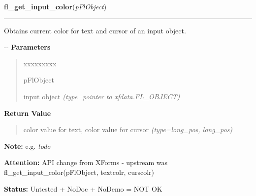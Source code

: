 \hspace{.8\funcindent}\begin{boxedminipage}{\funcwidth}

    \raggedright \textbf{fl\_get\_input\_color}(\textit{pFlObject})

    \vspace{-1.5ex}

    \rule{\textwidth}{0.5\fboxrule}
\setlength{\parskip}{2ex}

Obtains current color for text and cursor of an input object.

-{}-
\setlength{\parskip}{1ex}
      \textbf{Parameters}
      \vspace{-1ex}

      \begin{quote}
        \begin{Ventry}{xxxxxxxxx}

          \item[pFlObject]


input object
            {\it (type=pointer to xfdata.FL\_OBJECT)}

        \end{Ventry}

      \end{quote}

      \textbf{Return Value}
    \vspace{-1ex}

      \begin{quote}

color value for text, color value for cursor
      {\it (type=long\_pos, long\_pos)}

      \end{quote}

\textbf{Note:} 
e.g. \emph{todo}


\textbf{Attention:} 
API change from XForms - upstream was
fl\_get\_input\_color(pFlObject, textcolr, curscolr)


\textbf{Status:} 
Untested + NoDoc + NoDemo = NOT OK


    \end{boxedminipage}

    \label{xformslib:flinput:fl_set_input_scroll}

    \vspace{0.5ex}

